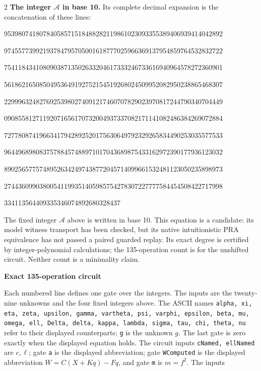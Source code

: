 \documentclass[10pt]{article}
\begin{document}
\begin{multicols}{2}
\textbf{The integer $\mathcal A$ in base 10.}
Its complete decimal expansion is the concatenation of these lines:\par
\begingroup\fontsize{7.7}{8.2}\selectfont{}\par
95398074180784058571518488282119861023093355389406939414042892\par
97455773992193784795705001618777025966369137954859764532832722\par
75411843410809038713502633204617333246733616940964578272360901\par
56186216508504953649192752154519268024509952082950238865468307\par
22999632482769253980274091217460707829023970817244790340704449\par
09085581271192071656170732004937337082171141082486384269072884\par
72778087419663417942892520175630649792329265834490253035577533\par
96449689808375788457488971017043689875433162972390177936123032\par
89025657757489526342497438772045714099661532481123050235898973\par
27443609903800541199351405985754278307227777584454508422717998\par
334113564409335346074892680328437\par
\endgroup
\normalfont\fontsize{7.7}{8.2}\selectfont
The fixed integer $\mathcal A$ above is written in base 10. This equation is a candidate: its model witness transport has been checked,
but its native intuitionistic PRA equivalence has not passed a paired guarded replay. Its exact degree is certified by integer-polynomial calculations;
the 135-operation count is for the unshifted circuit. Neither count is a
minimality claim.
\end{multicols}
\clearpage
\begin{center}{\large\bfseries Exact 135-operation circuit}\end{center}
Each numbered line defines one gate over the integers. The inputs are the
twenty-nine unknowns and the four fixed integers above. The ASCII names
\texttt{alpha, xi, eta, zeta, upsilon, gamma, vartheta, psi, varphi, epsilon, beta, mu, omega, ell, Delta, delta, kappa, lambda, sigma, tau, chi, theta, nu}
refer to their displayed counterparts; \texttt{g} is the unknown $g$. The last
gate is zero exactly when the displayed equation holds. The circuit inputs
\texttt{cNamed, ellNamed} are $c,\ell$; gate \texttt{a} is the displayed abbreviation; gate \texttt{WComputed} is the displayed abbreviation $W=C(X+Kq)-Fq$, and gate \texttt{m} is $m=f^2$. The inputs
\end{document}
